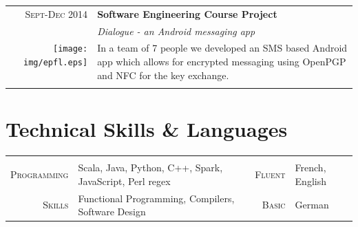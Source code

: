 \documentclass[a4paper,11pt]{article} %
\begin{document}
\begin{tabularx}{\textwidth}{r|X}

\textsc{Sept-Dec 2014} & \textbf{Software Engineering Course Project} \\
\multirow{4}{*}{ \texttt{[image: img/epfl.eps]}}
& \emph{Dialogue - an Android messaging app}\\ 
& \footnotesize{In a team of 7 people we developed an SMS based Android app which allows for encrypted messaging using OpenPGP
and NFC for the key exchange.}\\
\multicolumn{2}{c}{} \\


\end{tabularx}


\section{Technical Skills \& Languages}
\begin{center}

\vspace{-0.3cm}
\begin{tabularx}{\textwidth}{rX|rl}

& & & \\
\textsc{\large{Programming}} & Scala, Java, Python, C++, Spark, JavaScript, Perl regex &
\textsc{\large{Fluent}} & French, English \\
\textsc{\large{Skills}} & Functional Programming, Compilers, Software Design &
\textsc{\large{Basic}} & German \\

\end{tabularx}

\end{center}

\end{document}
